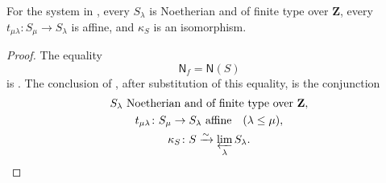 \begin{lemma}
  \label{lemma:nagata-final-noetherian-base-system}
  \checked{}

  For the system in
  , every $S_\lambda$ is
  Noetherian and of finite type over $\mathbf Z$, every
  $t_{\mu\lambda}\colon S_\mu\to S_\lambda$ is affine, and $\kappa_S$ is an
  isomorphism.
\end{lemma}

\begin{proof}
\checked
  The equality
  \[
    \mathsf N_f=\mathsf N(S)
  \]
  is .  The conclusion of
  , after substitution of this
  equality, is the conjunction
  \[
  \begin{gathered}
    S_\lambda\text{ Noetherian and of finite type over }\mathbf Z,\\
    t_{\mu\lambda}\colon S_\mu\to S_\lambda\text{ affine}
      \quad(\lambda\leq\mu),\\
    \kappa_S\colon S\xrightarrow{\sim}\varprojlim_\lambda S_\lambda.
  \end{gathered}
  \]
\end{proof}

